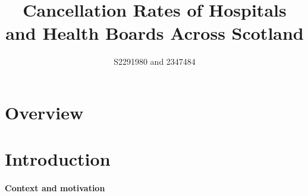 \documentclass[11pt,a4paper]{article}
\title{Cancellation Rates of Hospitals and Health Boards Across Scotland}
\author{S2291980 and 2347484}
\begin{document}
\maketitle


\section{Overview}



\section{Introduction}

\paragraph{Context and motivation}
\end{document}
